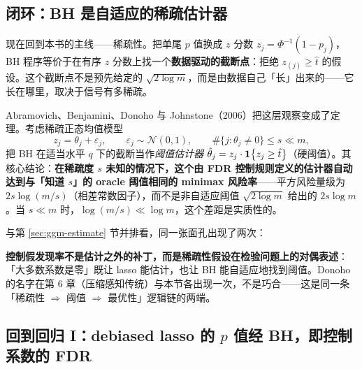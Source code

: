 \subsection{闭环：BH 是自适应的稀疏估计器}\label{sec:fdr-sparsity}

现在回到本书的主线——稀疏性。把单尾 $p$ 值换成 $z$ 分数 $z_j = \Phi^{-1}(1 - p_j)$，BH 程序等价于在有序 $z$ 分数上找一个\textbf{数据驱动的截断点}：拒绝 $z_{(j)} \ge \hat{t}$ 的假设。这个截断点不是预先给定的 $\sqrt{2 \log m}$，而是由数据自己「长」出来的——它长在哪里，取决于信号有多稀疏。

Abramovich、Benjamini、Donoho 与 Johnstone（2006）把这层观察变成了定理\cite{abramovich2006}。考虑稀疏正态均值模型
\[
  z_j = \theta_j + \varepsilon_j, \qquad \varepsilon_j \sim \mathcal{N}(0, 1),
  \qquad \#\{ j : \theta_j \neq 0 \} \le s \ll m,
\]
把 BH 在适当水平 $q$ 下的截断当作\emph{阈值估计器} $\hat\theta_j = z_j \cdot \mathbf{1}\!\left\{ z_j \ge \hat{t} \right\}$（硬阈值）。其核心结论：\textbf{在稀疏度 $s$ 未知的情况下，这个由 FDR 控制规则定义的估计器自动达到与「知道 $s$」的 oracle 阈值相同的 minimax 风险率}——平方风险量级为 $2 s \log(m/s)$（相差常数因子），而不是非自适应阈值 $\sqrt{2 \log m}$ 给出的 $2 s \log m$。当 $s \ll m$ 时，$\log(m/s) \ll \log m$，这个差距是实质性的。

与第 \ref{sec:ggm-estimate} 节并排看，同一张面孔出现了两次：
\begin{center}
\end{center}
\textbf{控制假发现率不是估计之外的补丁，而是稀疏性假设在检验问题上的对偶表述}：「大多数系数是零」既让 lasso 能估计，也让 BH 能自适应地找到阈值。Donoho 的名字在第 6 章（压缩感知传统）与本节各出现一次，不是巧合——这是同一条「稀疏性 $\Rightarrow$ 阈值 $\Rightarrow$ 最优性」逻辑链的两端。

\subsection[回到回归 I：debiased lasso 的 $p$ 值与 BH]{回到回归 I：debiased lasso 的 $p$ 值经 BH，即控制系数的 FDR}\label{sec:fdr-regression}

